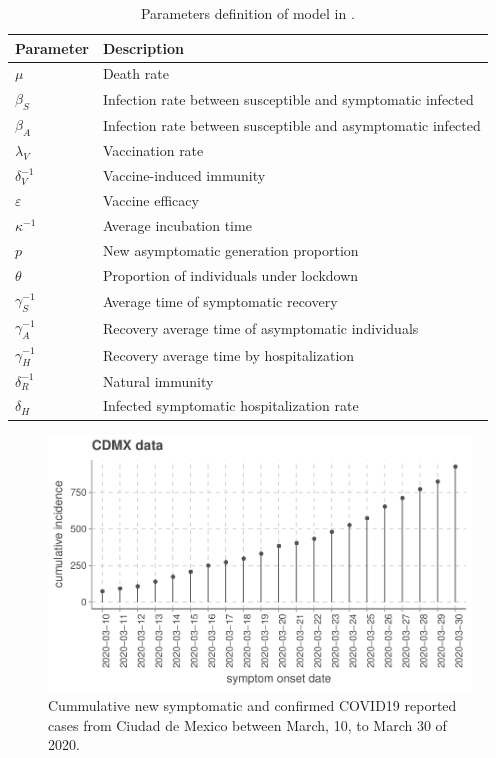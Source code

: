 \begin{table}[h!]
	\centering
	\begin{tabular}{>{\centering}%
        p{}%
        p{}
    }
		\toprule
		\textbf{Parameter} & \textbf{Description}
  	\\
  	\midrule
		$\mu$ &
			Death rate
		\\
        $\beta_S$ &
        	Infection rate between susceptible and symptomatic infected
		\\
        $\beta_A$ &
        	Infection rate between susceptible and asymptomatic infected
		\\
        $\lambda_V$ &
        	Vaccination rate
		\\
        $\delta_{V}^{-1}$ &
        Vaccine-induced immunity
		\\
        $\varepsilon$ &
        	Vaccine efficacy
		\\
        $\kappa^{-1}$ &
        	Average incubation time
        \\
		$p$ &
			New asymptomatic generation proportion
		\\
	    $\theta$ &
        	Proportion of individuals under lockdown
        \\
        $\gamma_{S}^{-1}$ &
        	Average time of symptomatic recovery
        \\
		$\gamma_{A}^{-1}$ &
			Recovery average time of asymptomatic individuals
		\\
		$\gamma_{H}^{-1}$ &
			Recovery average time by hospitalization
		\\
        $\delta_{R}^{-1}$ &
        	Natural immunity
  		\\
  		$\delta_{H}$ &
        	Infected symptomatic hospitalization rate
  		\\
  	\bottomrule
	\end{tabular}
		\caption{
			Parameters definition of model in
			.}
    \label{tbl:dynamics_base_parameters}
\end{table}
%
\begin{figure}[htb]
    \centering
    \includegraphics[scale=0.8, keepaspectratio]{Figures/cdmx_input_data}
    \caption{%
        Cummulative new symptomatic and confirmed COVID19 reported cases from
        Ciudad de Mexico between March, 10, to March 30 of 2020.
    }
    \label{fig:data_CDMX}
\end{figure}
